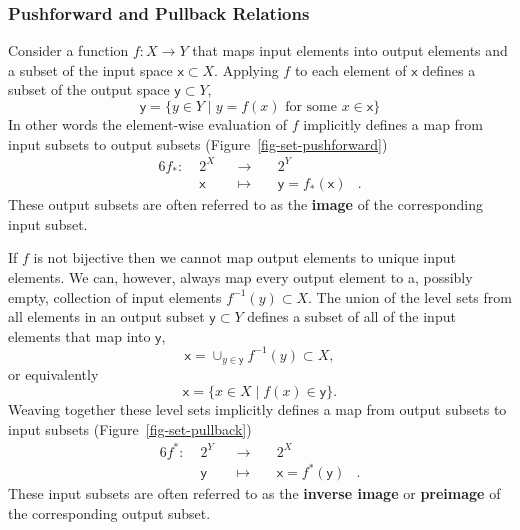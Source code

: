 \documentclass[
  letterpaper,
  DIV=11,
  numbers=noendperiod]{scrartcl}
\begin{document}
\hypertarget{pushforward-and-pullback-relations}{%
\subsubsection{Pushforward and Pullback
Relations}\label{pushforward-and-pullback-relations}}

Consider a function \(f : X \rightarrow Y\) that maps input elements
into output elements and a subset of the input space
\(\mathsf{x} \subset X\). Applying \(f\) to each element of
\(\mathsf{x}\) defines a subset of the output space
\(\mathsf{y} \subset Y\), \[
\mathsf{y} = \{ y \in Y \mid y = f(x) \text{ for some } x \in \mathsf{x} \}
\] In other words the element-wise evaluation of \(f\) implicitly
defines a map from input subsets to output subsets
(Figure~\ref{fig-set-pushforward}) \begin{alignat*}{6}
f_{*} :\; & 2^X & &\rightarrow& \; & 2^Y &
\\
& \mathsf{x} & &\mapsto& & \mathsf{y} = f_{*}(\mathsf{x}) &.
\end{alignat*} These output subsets are often referred to as the
\textbf{image} of the corresponding input subset.

If \(f\) is not bijective then we cannot map output elements to unique
input elements. We can, however, always map every output element to a,
possibly empty, collection of input elements \(f^{-1}(y) \subset X\).
The union of the level sets from all elements in an output subset
\(\mathsf{y} \subset Y\) defines a subset of all of the input elements
that map into \(\mathsf{y}\), \[
\mathsf{x} = \cup_{y \in \mathsf{y}} f^{-1}(y) \subset X,
\] or equivalently \[
\mathsf{x} = \{ x \in X \mid f(x) \in \mathsf{y} \}.
\] Weaving together these level sets implicitly defines a map from
output subsets to input subsets (Figure~\ref{fig-set-pullback})
\begin{alignat*}{6}
f^{*} :\; & 2^Y & &\rightarrow& \; & 2^X &
\\
& \mathsf{y} & &\mapsto& & \mathsf{x} = f^{*}(\mathsf{y}) &.
\end{alignat*} These input subsets are often referred to as the
\textbf{inverse image} or \textbf{preimage} of the corresponding output
subset.
\end{document}
